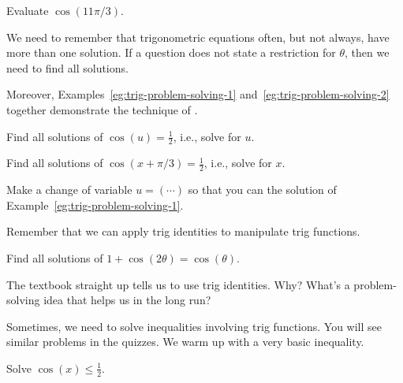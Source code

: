 \documentclass[../main.tex]{subfiles}
\begin{document}
\begin{example}
  Evaluate \(\cos(11\pi/3)\).

\end{example}

We need to remember that trigonometric equations often, but not always, have more than one solution. If a question does not state a restriction for \(\theta\), then we need to find all solutions.

Moreover, Examples~\ref{eg:trig-problem-solving-1} and~\ref{eg:trig-problem-solving-2} together demonstrate the technique of .

\begin{example} \label{eg:trig-problem-solving-1}
  Find all solutions of \(\cos(u) = \frac{1}{2}\), i.e., solve for \(u\).

\end{example}

\begin{example} \label{eg:trig-problem-solving-2}
  Find all solutions of \(\cos(x + \pi/3) = \frac{1}{2}\), i.e., solve for \(x\).

  {\footnotesize Make a change of variable \(u = (\cdots)\) so that you can  the solution of Example~\ref{eg:trig-problem-solving-1}.}


\end{example}
\clearpage

Remember that we can apply trig identities to manipulate trig functions.
\begin{example}
  Find all solutions of \(1 + \cos(2 \theta) = \cos(\theta)\).

  {\scriptsize The textbook straight up tells us to use trig identities. Why? What's a  problem-solving idea that helps us in the long run?}

\end{example}
\clearpage

Sometimes, we need to solve inequalities involving trig functions. You will see similar problems in the quizzes. We warm up with a very basic inequality.
\begin{example} \label{eg:cos(x)<1/2}
  Solve \(\cos(x) \le \frac{1}{2}\).

\end{example}
\end{document}
